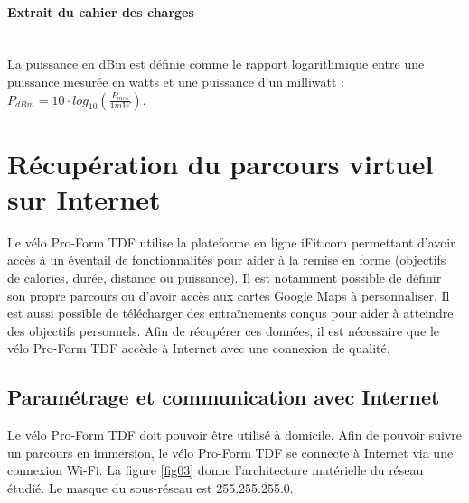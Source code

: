 \paragraph{Extrait du cahier des charges} ~\ \\

La puissance en dBm est définie comme le rapport logarithmique entre une puissance mesurée en watts et une puissance d'un milliwatt : $P_{dBm} = 10\cdot log_{10}\left(\frac{P_{mes}}{1mW}\right)$.


\newpage

\section{Récupération du parcours virtuel sur Internet}

Le vélo Pro-Form TDF utilise la plateforme en ligne iFit.com permettant d'avoir accès à un éventail de fonctionnalités pour aider à la remise en forme (objectifs de calories, durée, distance ou puissance). Il est notamment possible de définir son propre parcours ou d'avoir accès aux cartes Google Maps à personnaliser. Il est aussi possible de télécharger des entraînements conçus pour aider à atteindre des objectifs personnels. Afin de récupérer ces données, il est nécessaire que le vélo Pro-Form TDF accède à Internet avec une connexion de qualité.

\subsection{Paramétrage et communication avec Internet}


Le vélo Pro-Form TDF doit pouvoir être utilisé à domicile. Afin de pouvoir suivre un parcours en immersion, le vélo Pro-Form TDF se connecte à Internet via une connexion Wi-Fi. La figure \ref{fig03} donne l'architecture matérielle du réseau étudié. Le masque du sous-réseau est 255.255.255.0.




